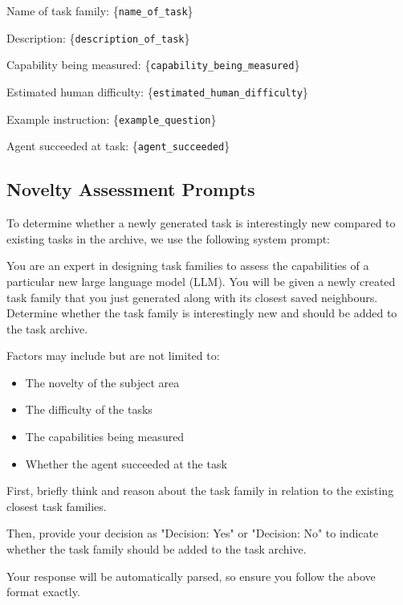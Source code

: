 \begin{tcolorbox}[
    breakable,
    boxrule=0.5pt,
    sharp corners,
    fontupper=\small,
    colback=orange!5!white,
    colframe=orange!80!black,
    title={Task Embedding Prompt}
]
Name of task family: \{\texttt{name\_of\_task}\}

Description: \{\texttt{description\_of\_task}\}

Capability being measured: \{\texttt{capability\_being\_measured}\}

Estimated human difficulty: \{\texttt{estimated\_human\_difficulty}\}

Example instruction: \{\texttt{example\_question}\}

Agent succeeded at task: \{\texttt{agent\_succeeded}\}
\end{tcolorbox}

\subsection{Novelty Assessment Prompts}
\label{appsubsec:novelty_assessment_prompts}

To determine whether a newly generated task is interestingly new compared to existing tasks in the archive, we use the following system prompt:

\begin{tcolorbox}[
    breakable,
    boxrule=0.5pt,
    sharp corners,
    fontupper=\small,
    colback=orange!5!white,
    colframe=orange!80!black,
    title={Interestingly New System Prompt}
]
You are an expert in designing task families to assess the capabilities of a particular new large language model (LLM).
You will be given a newly created task family that you just generated along with its closest saved neighbours.
Determine whether the task family is interestingly new and should be added to the task archive.

Factors may include but are not limited to:
\begin{itemize}[leftmargin=2em]
    \item The novelty of the subject area
    \item The difficulty of the tasks
    \item The capabilities being measured
    \item Whether the agent succeeded at the task
\end{itemize}

First, briefly think and reason about the task family in relation to the existing closest task families.

Then, provide your decision as "Decision: Yes" or "Decision: No" to indicate whether the task family should be added to the task archive.

Your response will be automatically parsed, so ensure you follow the above format exactly.
\end{tcolorbox}

